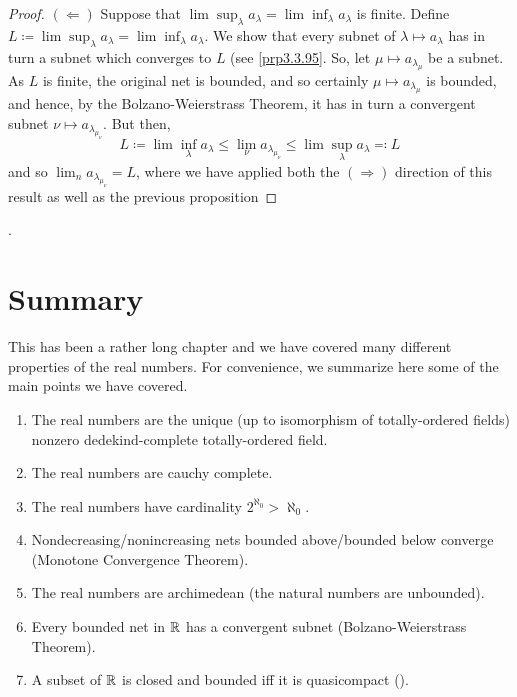 \begin{prp}
\begin{proof}
\blankline
\noindent
$(\Leftarrow )$ Suppose that $\lim \sup _\lambda a_\lambda =\lim \inf _\lambda a_\lambda$  is finite.  Define $L\coloneqq \lim \sup _\lambda a_\lambda =\lim \inf _\lambda a_\lambda$.  We show that every subnet of $\lambda \mapsto a_\lambda$ has in turn a subnet which converges to $L$ (see \cref{prp3.3.95}.  So, let $\mu \mapsto a_{\lambda _\mu}$ be a subnet.  As $L$ is finite, the original net is bounded, and so certainly $\mu \mapsto a_{\lambda _\mu}$ is bounded, and hence, by the Bolzano-Weierstrass Theorem, it has in turn a convergent subnet $\nu \mapsto a_{\lambda _{\mu _\nu}}$.  But then,
\begin{equation}
L\coloneqq \lim \inf _\lambda a_\lambda \leq \lim _\nu a_{\lambda _{\mu _\nu}}\leq \lim \sup _\lambda a_\lambda \eqqcolon L
\end{equation}
and so $\lim _na_{\lambda _{\mu _\nu}}=L$, where we have applied both the $(\Rightarrow )$ direction of this result as well as the previous proposition
\end{proof}.
\end{prp}

\section{Summary}

This has been a rather long chapter and we have covered many different properties of the real numbers.  For convenience, we summarize here some of the main points we have covered.
\begin{enumerate}
\item The real numbers are the unique (up to isomorphism of totally-ordered fields) nonzero dedekind-complete totally-ordered field.
\item The real numbers are cauchy complete.
\item The real numbers have cardinality $2^{\aleph _0}>
\aleph _0$.
\item Nondecreasing/nonincreasing nets bounded above/bounded below converge (Monotone Convergence Theorem).
\item The real numbers are archimedean (the natural numbers are unbounded).
\item Every bounded net in $\mathbb{R}$ has a convergent subnet (Bolzano-Weierstrass Theorem).
\item A subset of $\mathbb{R}$ is closed and bounded iff it is quasicompact ().
\end{enumerate}
